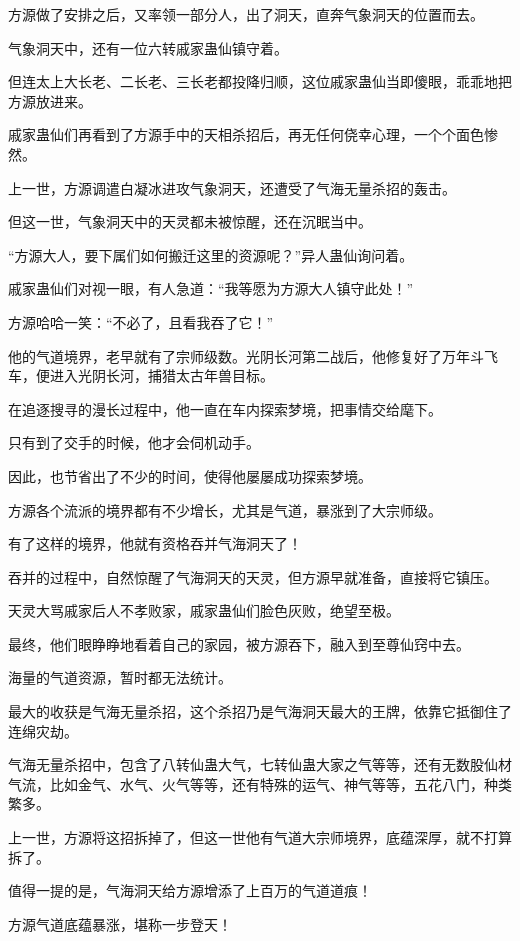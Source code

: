 \begin{this_body}
方源做了安排之后，又率领一部分人，出了洞天，直奔气象洞天的位置而去。

气象洞天中，还有一位六转戚家蛊仙镇守着。

但连太上大长老、二长老、三长老都投降归顺，这位戚家蛊仙当即傻眼，乖乖地把方源放进来。

戚家蛊仙们再看到了方源手中的天相杀招后，再无任何侥幸心理，一个个面色惨然。

上一世，方源调遣白凝冰进攻气象洞天，还遭受了气海无量杀招的轰击。

但这一世，气象洞天中的天灵都未被惊醒，还在沉眠当中。

“方源大人，要下属们如何搬迁这里的资源呢？”异人蛊仙询问着。

戚家蛊仙们对视一眼，有人急道：“我等愿为方源大人镇守此处！”

方源哈哈一笑：“不必了，且看我吞了它！”

他的气道境界，老早就有了宗师级数。光阴长河第二战后，他修复好了万年斗飞车，便进入光阴长河，捕猎太古年兽目标。

在追逐搜寻的漫长过程中，他一直在车内探索梦境，把事情交给麾下。

只有到了交手的时候，他才会伺机动手。

因此，也节省出了不少的时间，使得他屡屡成功探索梦境。

方源各个流派的境界都有不少增长，尤其是气道，暴涨到了大宗师级。

有了这样的境界，他就有资格吞并气海洞天了！

吞并的过程中，自然惊醒了气海洞天的天灵，但方源早就准备，直接将它镇压。

天灵大骂戚家后人不孝败家，戚家蛊仙们脸色灰败，绝望至极。

最终，他们眼睁睁地看着自己的家园，被方源吞下，融入到至尊仙窍中去。

海量的气道资源，暂时都无法统计。

最大的收获是气海无量杀招，这个杀招乃是气海洞天最大的王牌，依靠它抵御住了连绵灾劫。

气海无量杀招中，包含了八转仙蛊大气，七转仙蛊大家之气等等，还有无数股仙材气流，比如金气、水气、火气等等，还有特殊的运气、神气等等，五花八门，种类繁多。

上一世，方源将这招拆掉了，但这一世他有气道大宗师境界，底蕴深厚，就不打算拆了。

值得一提的是，气海洞天给方源增添了上百万的气道道痕！

方源气道底蕴暴涨，堪称一步登天！

\end{this_body}

